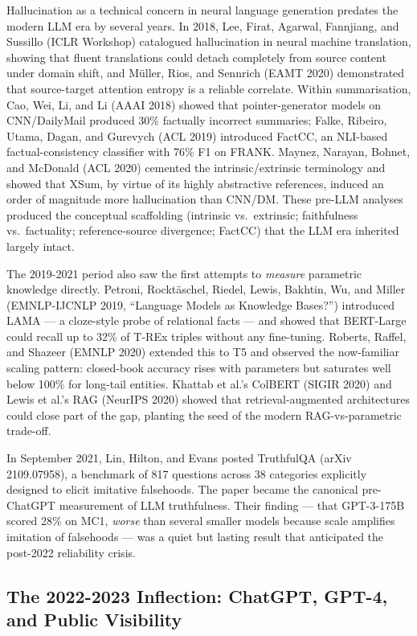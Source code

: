 \documentclass{article}
\begin{document}
Hallucination as a technical concern in neural language generation predates the modern LLM era by several years. In 2018, Lee, Firat, Agarwal, Fannjiang, and Sussillo (ICLR Workshop) catalogued hallucination in neural machine translation, showing that fluent translations could detach completely from source content under domain shift, and Müller, Rios, and Sennrich (EAMT 2020) demonstrated that source-target attention entropy is a reliable correlate. Within summarisation, Cao, Wei, Li, and Li (AAAI 2018) showed that pointer-generator models on CNN/DailyMail produced 30\% factually incorrect summaries; Falke, Ribeiro, Utama, Dagan, and Gurevych (ACL 2019) introduced FactCC, an NLI-based factual-consistency classifier with 76\% F1 on FRANK. Maynez, Narayan, Bohnet, and McDonald (ACL 2020) cemented the intrinsic/extrinsic terminology and showed that XSum, by virtue of its highly abstractive references, induced an order of magnitude more hallucination than CNN/DM. These pre-LLM analyses produced the conceptual scaffolding (intrinsic vs.~extrinsic; faithfulness vs.~factuality; reference-source divergence; FactCC) that the LLM era inherited largely intact.

The 2019-2021 period also saw the first attempts to \emph{measure} parametric knowledge directly. Petroni, Rocktäschel, Riedel, Lewis, Bakhtin, Wu, and Miller (EMNLP-IJCNLP 2019, ``Language Models as Knowledge Bases?'') introduced LAMA --- a cloze-style probe of relational facts --- and showed that BERT-Large could recall up to 32\% of T-REx triples without any fine-tuning. Roberts, Raffel, and Shazeer (EMNLP 2020) extended this to T5 and observed the now-familiar scaling pattern: closed-book accuracy rises with parameters but saturates well below 100\% for long-tail entities. Khattab et al.'s ColBERT (SIGIR 2020) and Lewis et al.'s RAG (NeurIPS 2020) showed that retrieval-augmented architectures could close part of the gap, planting the seed of the modern RAG-vs-parametric trade-off.

In September 2021, Lin, Hilton, and Evans posted TruthfulQA (arXiv 2109.07958), a benchmark of 817 questions across 38 categories explicitly designed to elicit imitative falsehoods. The paper became the canonical pre-ChatGPT measurement of LLM truthfulness. Their finding --- that GPT-3-175B scored 28\% on MC1, \emph{worse} than several smaller models because scale amplifies imitation of falsehoods --- was a quiet but lasting result that anticipated the post-2022 reliability crisis.

\subsection{The 2022-2023 Inflection: ChatGPT, GPT-4, and Public Visibility}\label{the-2022-2023-inflection-chatgpt-gpt-4-and-public-visibility}
\end{document}
